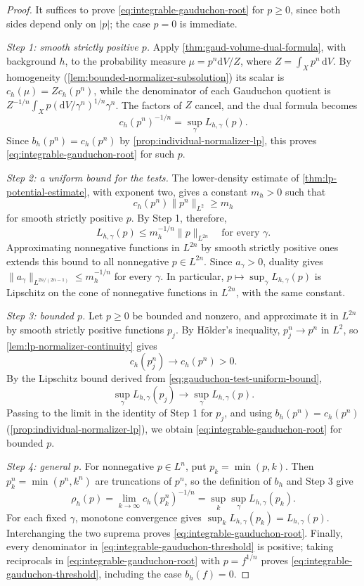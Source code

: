 \begin{proof}
It suffices to prove \eqref{eq:integrable-gauduchon-root} for $p\geq0$, since both sides depend only on $|p|$; the case $p=0$ is immediate.

\emph{Step 1: smooth strictly positive $p$.} Apply \cref{thm:gaud-volume-dual-formula}, with background $h$, to the probability measure $\mu=p^n\mathrm{d}V/Z$, where $Z=\int_Xp^n\,\mathrm{d}V$. By homogeneity (\cref{lem:bounded-normalizer-subsolution}) its scalar is $c_h(\mu)=Zc_h(p^n)$, while the denominator of each Gauduchon quotient is $Z^{-1/n}\int_Xp(\mathrm{d}V/\gamma^n)^{1/n}\gamma^n$. The factors of $Z$ cancel, and the dual formula becomes
\[
 c_h(p^n)^{-1/n}=\sup_\gamma L_{h,\gamma}(p).
\]
Since $b_h(p^n)=c_h(p^n)$ by \cref{prop:individual-normalizer-lp}, this proves \eqref{eq:integrable-gauduchon-root} for such $p$.

\emph{Step 2: a uniform bound for the tests.} The lower-density estimate of \cref{thm:lp-potential-estimate}, with exponent two, gives a constant $m_h>0$ such that
\[
 c_h(p^n)\|p^n\|_{L^2}\geq m_h
\]
for smooth strictly positive $p$. By Step 1, therefore,
\begin{equation}\label{eq:gauduchon-test-uniform-bound}
 L_{h,\gamma}(p)\leq m_h^{-1/n}\|p\|_{L^{2n}}
 \quad\text{for every }\gamma.
\end{equation}
Approximating nonnegative functions in $L^{2n}$ by smooth strictly positive ones extends this bound to all nonnegative $p\in L^{2n}$. Since $a_\gamma>0$, duality gives $\|a_\gamma\|_{L^{2n/(2n-1)}}\leq m_h^{-1/n}$ for every $\gamma$. In particular, $p\mapsto\sup_\gamma L_{h,\gamma}(p)$ is Lipschitz on the cone of nonnegative functions in $L^{2n}$, with the same constant.

\emph{Step 3: bounded $p$.} Let $p\geq0$ be bounded and nonzero, and approximate it in $L^{2n}$ by smooth strictly positive functions $p_j$. By H\"older's inequality, $p_j^n\to p^n$ in $L^2$, so \cref{lem:lp-normalizer-continuity} gives
\[
 c_h(p_j^n)\longrightarrow c_h(p^n)>0.
\]
By the Lipschitz bound derived from \eqref{eq:gauduchon-test-uniform-bound},
\[
 \sup_\gamma L_{h,\gamma}(p_j)
       \longrightarrow\sup_\gamma L_{h,\gamma}(p).
\]
Passing to the limit in the identity of Step 1 for $p_j$, and using $b_h(p^n)=c_h(p^n)$ (\cref{prop:individual-normalizer-lp}), we obtain \eqref{eq:integrable-gauduchon-root} for bounded $p$.

\emph{Step 4: general $p$.} For nonnegative $p\in L^n$, put $p_k=\min(p,k)$. Then $p_k^n=\min(p^n,k^n)$ are truncations of $p^n$, so the definition of $b_h$ and Step 3 give
\[
 \rho_h(p)=\lim_{k\to\infty}c_h(p_k^n)^{-1/n}
          =\sup_k\sup_\gamma L_{h,\gamma}(p_k).
\]
For each fixed $\gamma$, monotone convergence gives
$\sup_kL_{h,\gamma}(p_k)=L_{h,\gamma}(p)$. Interchanging the two suprema proves \eqref{eq:integrable-gauduchon-root}. Finally, every denominator in \eqref{eq:integrable-gauduchon-threshold} is positive; taking reciprocals in \eqref{eq:integrable-gauduchon-root} with $p=f^{1/n}$ proves \eqref{eq:integrable-gauduchon-threshold}, including the case $b_h(f)=0$.
\end{proof}

